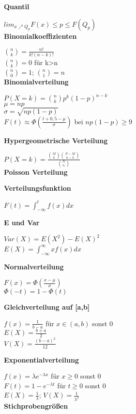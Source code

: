 \documentclass[10pt,twocolumn,a4paper]{article}
\begin{document}
\begin{flushleft}

\textbf{Quantil}

$lim_{x\nearrow Q_p}F(x) \leq p \leq F(Q_p)$\\

\textbf{Binomialkoeffizienten}

$\binom{n}{k} = \frac{n!}{k!(n-k)!}$\\
$\binom{n}{k} = 0$ für k>n\\
$\binom{n}{0} = 1$; $\binom{n}{1} = n$\\

\textbf{Binomialverteilung}

$P(X=k) = \binom{n}{k}p^k(1-p)^{n-k}$\\
$\mu = np$\\
$\sigma = \sqrt{np(1-p)}$\\
$F(t) \approx \Phi(\frac{t+0,5-\mu}{\sigma})$ bei $np(1-p) \geq 9$

\textbf{Hypergeometrische Verteilung}

$P(X=k) = \frac{\binom{M}{k}\binom{N-M}{n-k}}{\binom{N}{n}}$\\

\textbf{Poisson Verteilung}

\textbf{Verteilungsfunktion}

$F(t) = \int_{-\infty}^t f(x) dx$

\textbf{E und Var}

$Var(X) = E(X^2) - E(X)^2$\\
$E(X) = \int_{-\infty}^{\infty} xf(x) dx$

\textbf{Normalverteilung}

$F(x) = \Phi(\frac{x-\mu}{\sigma})$\\
$\Phi(-t) = 1-\Phi(t)$

\textbf{Gleichverteilung auf [a,b]}

$f(x) = \frac{1}{b-a}$ für $x \in (a,b)$ sonst 0\\
$E(X) = \frac{b+a}{2}$\\
$V(X) = \frac{(b-a)^2}{12}$

\textbf{Exponentialverteilung}

$f(x) = \lambda e^{-\lambda x}$ für $x \geq 0$ sonst 0\\
$F(t) = 1-e^{-\lambda t}$ für $t \geq 0$ sonst 0\\
$E(X) = \frac{1}{\lambda}$; $V(X) = \frac{1}{\lambda^2}$\\

\textbf{Stichprobengrößen}


\end{flushleft}
\end{document}
